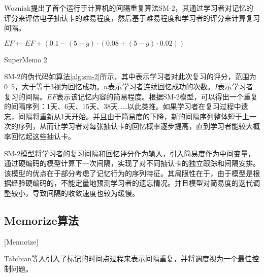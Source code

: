 Wozniak提出了首个运行于计算机的间隔重复算法SM-2\cite{woiniakOptimizationRepetitionSpacing1994}，其通过学习者对记忆的评分来评估电子抽认卡的难易程度，然后基于难易程度和学习者的评分来计算复习间隔。

\begin{algorithm}[htbp]
    $EF \leftarrow  EF + (0.1-(5-g)\cdot(0.08+(5-g)\cdot0.02))$\;
\caption{SuperMemo 2}
\label{alg:sm-2}
\end{algorithm}

SM-2的伪代码如算法\ref{alg:sm-2}所示，其中表示学习者对此次复习的评分，范围为0~5，大于等于3视为回忆成功。$n$表示学习者连续回忆成功的次数。$I$表示学习者复习的间隔。$EF$表示该记忆内容的简易程度。根据SM-2模型，可以得出一个重复的间隔序列：1天、6天、15天、38天……以此类推。如果学习者在复习过程中遗忘，间隔将重新从1天开始。并且由于简易度的下降，新的间隔序列整体短于上一次的序列，从而让学习者对每张抽认卡的回忆概率逐步提高，直到学习者能较大概率回忆起这些抽认卡。

SM-2模型将学习者的复习间隔和回忆评分作为输入，引入简易度作为中间变量，通过硬编码的模型计算下一次间隔，实现了对不同抽认卡的独立跟踪和间隔安排。该模型的优点在于部分考虑了记忆行为的序列特征。其局限性在于，由于模型是根据经验硬编码的，不能定量地预测学习者的遗忘情况。并且模型对简易度的迭代调整较小，导致间隔的收敛速度也较为缓慢。

\subsection{Memorize算法}[Memorize]

Tabibian等人\cite{tabibianEnhancingHumanLearning2019}引入了标记的时间点过程来表示间隔重复，并将调度视为一个最佳控制问题。

